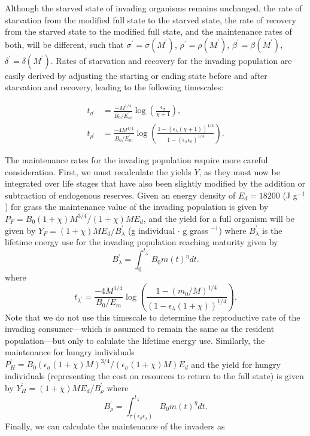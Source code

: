 \documentclass{pnastwo}
\begin{document}
\begin{article}
Although the starved state of invading organisms remains unchanged, the rate of starvation from the modified full state to the starved state, the rate of recovery from the starved state to the modified full state, and the maintenance rates of both, will be different, such that $\sigma^\prime = \sigma(M^\prime)$, $\rho^\prime = \rho(M^\prime)$, $\beta^\prime = \beta(M^\prime)$, $\delta^\prime = \delta(M^\prime)$.
Rates of starvation and recovery for the invading population are easily derived by adjusting the starting or ending state before and after starvation and recovery, leading to the following timescales:

\begin{align}
t_{\sigma^\prime} &= \frac{-M^{1/4}}{B_0/E_m^\prime}\log \left(\frac{\epsilon_\sigma}{\chi +1}\right), \\ \nonumber
t_{\rho^\prime} &= \frac{-4 M^{1/4} }{B_0/E_m^\prime}\log \left(\frac{1-( \epsilon_\lambda(\chi +1))^{1/4}}{1-(\epsilon_\lambda \epsilon_\sigma)^{1/4}}\right).
\end{align}


The maintenance rates for the invading population require more careful consideration.
First, we must recalculate the yields $Y$, as they must now be integrated over life stages that have also been slightly modified by the addition or subtraction of endogenous reserves.
Given an energy density of $E_{d}=18200$ (J g$^{-1}$) for grass \cite{estermann} the maintenance value of the invading population is given by $P_{F}=B_{0}(1+\chi)M^{3/4}/(1+\chi)ME_{d}$, and the yield for a full organism will be given by $Y_{F}=(1+\chi)ME_{d}/B^{\prime}_{\lambda}$ (g individual $\cdot$ g grass $^{-1}$) where $B^{\prime}_{\lambda}$ is the lifetime energy use for the invading population reaching maturity given by
\begin{equation}
B^{\prime}_{\lambda}=\int_{0}^{t_{\lambda^\prime}}B_{0}m\left(t\right)^{\eta}dt.
\end{equation}
where
\begin{equation}
t_{\lambda^\prime} = \frac{-4 M^{1/4} }{B_0/E_m}\log \left(\frac{1-(m_0/M)^{1/4}}{(1-\epsilon_\lambda (1+\chi))^{1/4}} \right).
\end{equation}
Note that we do not use this timescale to determine the reproductive rate of the invading consumer---which is assumed to remain the same as the resident population---but only to calulate the lifetime energy use.
Similarly, the maintenance for hungry individuals $P^\prime_{H}=B_{0}(\epsilon_{\sigma}(1+\chi)M)^{3/4}/(\epsilon_{\sigma}(1+\chi)M)E_{d}$ and the yield for hungry individuals (representing the cost on resources to return to the full state) is given by $Y^\prime_{H}=(1+\chi)ME_{d}/B^{\prime}_{\rho}$ where
\begin{equation}
B^{\prime}_{\rho}=\int_{\tau\left(\epsilon_{\sigma}\epsilon_{\lambda}\right)}^{t_{\lambda^\prime}}B_{0}m\left(t\right)^{\eta}dt.
\end{equation}
Finally, we can calculate the maintenance of the invaders as


\end{article}
\end{document}
